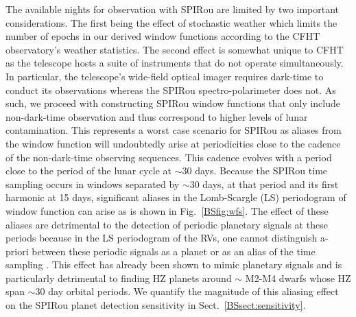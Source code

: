 The available nights for observation with SPIRou are limited by two important considerations.
The first being the effect
of stochastic weather which limits the number of epochs in our derived window functions according to the
CFHT observatory's weather statistics. The second effect is somewhat unique to CFHT as the telescope hosts
a suite of instruments that do not operate simultaneously. In particular, the telescope's wide-field
optical imager requires dark-time to conduct its observations whereas the SPIRou spectro-polarimeter
does not. As such, we proceed with constructing SPIRou window functions that only include
non-dark-time observation and thus correspond to higher levels of lunar contamination. This represents
a worst case scenario for SPIRou as aliases from the window function will undoubtedly arise at periodicities
close to the cadence of the non-dark-time observing sequences. This cadence 
evolves with a period close to the period of the lunar cycle at $\sim 30$ days.
Because the SPIRou time sampling occurs in windows separated by $\sim 30$ days,
at that period and its first harmonic at 15 days, significant aliases in the Lomb-Scargle (LS)
periodogram \citep{scargle82}
of window function can arise as is shown in Fig.~\ref{BSfig:wfs}. The effect of these aliases are
detrimental to the detection of periodic planetary signals at these periods because
in the LS periodogram of the RVs, one cannot
distinguish a-priori between these periodic signals as a planet or as an alias of the time sampling
\citep{dawson10}.
This effect has already been shown to mimic planetary signals \citep[e.g.][]{rajpaul16} and is particularly
detrimental to finding HZ planets around $\sim$ M2-M4 dwarfs whose HZ span $\sim 30$ day orbital periods.
We quantify the magnitude of this aliasing effect on the SPIRou planet detection sensitivity in
Sect.~\ref{BSsect:sensitivity}.

